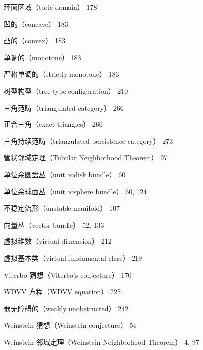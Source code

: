 {\noindent 环面区域（toric domain） 178\par
\noindent\hspace*{1.5em}凹的（concave） 183\par
\noindent\hspace*{1.5em}凸的（convex） 183\par
\noindent\hspace*{1.5em}单调的（monotone） 183\par
\noindent\hspace*{3em}严格单调的（strictly monotone） 183\par
\noindent 树型构型（tree-type configuration） 210\par
\noindent 三角范畴（triangulated category） 266\par
\noindent\hspace*{1.5em}正合三角（exact triangles） 266\par
\noindent 三角持续范畴（triangulated persistence category） 273\par
\noindent 管状邻域定理（Tubular Neighborhood Theorem） 97\par
\noindent 单位余圆盘丛（unit codisk bundle） 60\par
\noindent 单位余球面丛（unit cosphere bundle） 60, 124\par
\noindent 不稳定流形（unstable manifold） 107\par
\noindent 向量丛（vector bundle） 52, 133\par
\noindent 虚拟维数（virtual dimension） 212\par
\noindent 虚拟基本类（virtual fundamental class） 219\par
\noindent Viterbo 猜想（Viterbo's conjecture） 170\par
\noindent WDVV 方程（WDVV equation） 225\par
\noindent 弱无障碍的（weakly unobstructed） 242\par
\noindent Weinstein 猜想（Weinstein conjecture） 54\par
\noindent Weinstein 邻域定理（Weinstein Neighborhood Theorem） 4, 97\par
}
